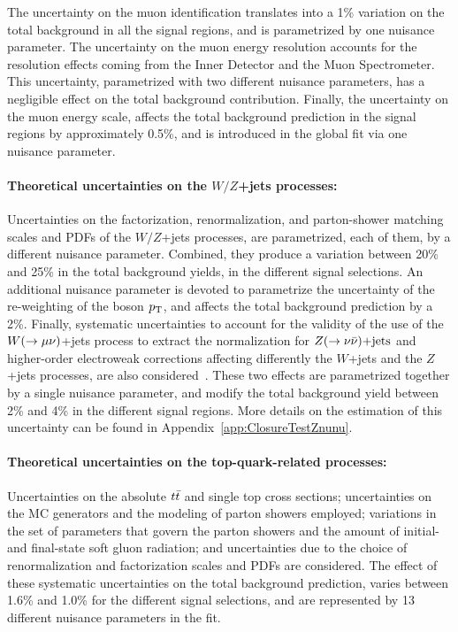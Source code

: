 The uncertainty on the muon identification translates into a 1\% variation on the total background in all the signal regions, and is parametrized by one nuisance parameter.
The uncertainty on the muon energy resolution accounts for the resolution effects coming from the Inner Detector and the Muon Spectrometer.
This uncertainty, parametrized with two different nuisance parameters, has a negligible effect on the total background contribution.
Finally, the uncertainty on the muon energy scale, affects the total background prediction in the signal regions by approximately 0.5\%, and is introduced in the global fit via one nuisance parameter.

\paragraph{Theoretical uncertainties on the $W/Z$+jets processes:}
Uncertainties on the factorization, renormalization, and parton-shower matching scales and PDFs of the $W/Z$+jets processes, are parametrized, each of them, by a different nuisance parameter.
Combined, they produce a variation between 20\% and 25\% in the total background yields, in the different signal selections.
An additional nuisance parameter is devoted to parametrize the uncertainty of the re-weighting of the boson $p_{\mathrm{T}}$, and affects the total background prediction by a 2\%.
Finally, systematic uncertainties to account for the validity of the use of the $W(\rightarrow \mu \nu)$+jets process to extract the normalization for $Z(\rightarrow \nu \bar{\nu})\text{+jets}$ and higher-order electroweak corrections affecting differently the $W$+jets and the $Z$+jets processes, are also considered~\cite{Denner:2009gj,Denner:2011vu,Denner:2012ts}.
These two effects are parametrized together by a single nuisance parameter, and modify the total background yield between 2\% and 4\% in the different signal regions.
More details on the estimation of this uncertainty can be found in Appendix~\ref{app:ClosureTestZnunu}.

\paragraph{Theoretical uncertainties on the top-quark-related processes:} Uncertainties on the absolute $t\bar{t}$ and single top cross sections; uncertainties on the MC generators and the modeling of parton showers employed; variations in the set of parameters that govern the parton showers and the amount of initial- and final-state soft gluon radiation; and uncertainties due to the choice of renormalization and factorization scales and PDFs are considered.
The effect of these systematic uncertainties on the total background prediction, varies between 1.6\% and 1.0\% for the different signal selections, and are represented by 13 different nuisance parameters in the fit.

